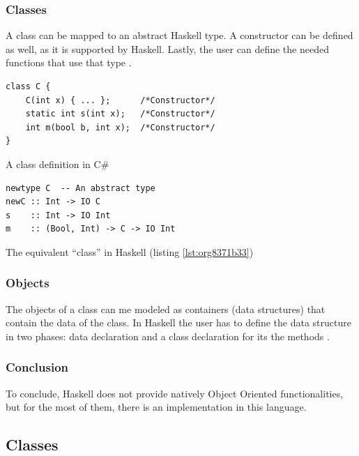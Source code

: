 \documentclass[a4paper, titlepage, twoside]{article}
\begin{document}
\subsubsection{Classes}
\label{sec:org92efae5}

A class can be mapped to an abstract Haskell type. A constructor can be defined as well, as it is supported by Haskell. Lastly, the user can define the needed functions that use that type \autocite{frankObjectorientationHaskellExploring2013}.
\begin{listing}[htbp]
\begin{verbatim}
class C {
    C(int x) { ... };      /*Constructor*/
    static int s(int x);   /*Constructor*/
    int m(bool b, int x);  /*Constructor*/
}
\end{verbatim}
\caption{\label{lst:org8371b33}A class definition in C\#}
\end{listing}

\begin{listing}[htbp]
\begin{verbatim}
newtype C  -- An abstract type
newC :: Int -> IO C
s    :: Int -> IO Int
m    :: (Bool, Int) -> C -> IO Int
\end{verbatim}
\caption{The equivalent ``class'' in Haskell (listing \ref{lst:org8371b33})}
\end{listing}

\subsubsection{Objects}
\label{sec:orga6fb136}

The objects of a class can me modeled as containers (data structures) that contain the data of the class. In Haskell the user has to define the data structure in two phases: data declaration and a class declaration for its the methods \autocite{frankObjectorientationHaskellExploring2013}.

\subsubsection{Conclusion}
\label{sec:orgf39a723}

To conclude, Haskell does not provide natively Object Oriented functionalities, but for the most of them, there is an implementation in this language.

\subsection{Classes}
\label{sec:org8136dea}
\end{document}
